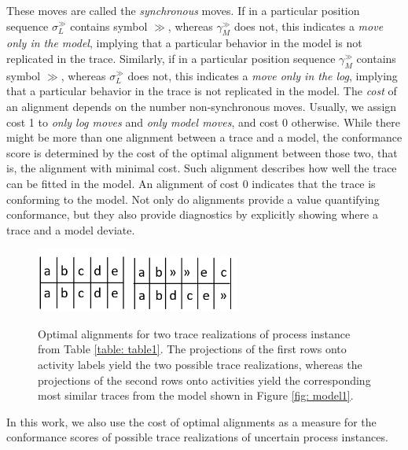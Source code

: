These moves are called the \textit{synchronous} moves.
If in a particular position sequence $\sigma_L^{\gg}$ contains symbol $\gg$, whereas $\gamma_M^{\gg}$ does not, this indicates a \textit{move only in the model}, implying that a particular behavior in the model is not replicated in the trace.
Similarly, if in a particular position sequence $\gamma_M^{\gg}$ contains symbol $\gg$, whereas $\sigma_L^{\gg}$ does not, this indicates a \textit{move only in the log}, implying that a particular behavior in the trace is not replicated in the model.
The \textit{cost} of an alignment depends on the number non-synchronous moves.
Usually, we assign cost 1 to \textit{only log moves} and \textit{only model moves}, and cost 0 otherwise.
While there might be more than one alignment between a trace and a model, the conformance score is determined by the cost of the optimal alignment between those two, that is, the alignment with minimal cost.
Such alignment describes how well the trace can be fitted in the model.
An alignment of cost 0 indicates that the trace is conforming to the model.
Not only do alignments provide a value quantifying conformance, but they also provide diagnostics by explicitly showing where a trace and a model deviate.
%
%
\begin{figure}[htp]
  \centering
 {\includegraphics[width=30mm]{figures/align1.png}\label{align1}
 	}
  {\label{align2}\includegraphics[width=36mm]{figures/align2.png}
	}
	\label{fig: two alignments}
	\caption{Optimal alignments for two trace realizations of process instance from Table \ref{table: table1}.
	The projections of the first rows onto activity labels yield the two possible trace realizations, whereas the projections of the second rows onto activities yield the corresponding most similar traces from the model shown in Figure \ref{fig: model1}.}
\end{figure}
%
In this work, we also use the cost of optimal alignments as a measure for the conformance scores of possible trace realizations of uncertain process instances.
%
%
%
%
%
%
%